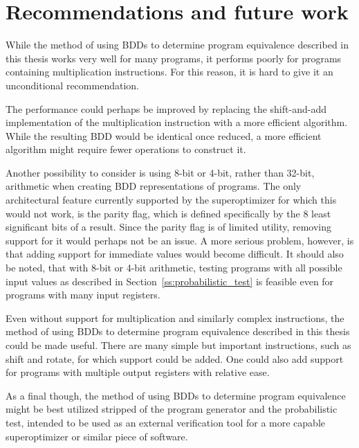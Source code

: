 \documentclass[a4paper,11pt]{kth-mag}
\begin{document}
\chapter{Recommendations and future work}
\label{ch:recommendations_future_work}

While the method of using BDDs to determine program equivalence described in this thesis works very well for many programs, it performs poorly for programs containing multiplication instructions.
For this reason, it is hard to give it an unconditional recommendation.

The performance could perhaps be improved by replacing the shift-and-add implementation of the multiplication instruction with a more efficient algorithm.
While the resulting BDD would be identical once reduced, a more efficient algorithm might require fewer operations to construct it.

Another possibility to consider is using 8-bit or 4-bit, rather than 32-bit, arithmetic when creating BDD representations of programs.
The only architectural feature currently supported by the superoptimizer for which this would not work, is the parity flag, which is defined specifically by the 8 least significant bits of a result.
Since the parity flag is of limited utility, removing support for it would perhaps not be an issue.
A more serious problem, however, is that adding support for immediate values would become difficult.
It should also be noted, that with 8-bit or 4-bit arithmetic, testing programs with all possible input values as described in Section~\ref{ss:probabilistic_test} is feasible even for programs with many input registers.

Even without support for multiplication and similarly complex instructions, the method of using BDDs to determine program equivalence described in this thesis could be made useful.
There are many simple but important instructions, such as shift and rotate, for which support could be added.
One could also add support for programs with multiple output registers with relative ease.

As a final though, the method of using BDDs to determine program equivalence might be best utilized stripped of the program generator and the probabilistic test, intended to be used as an external verification tool for a more capable superoptimizer or similar piece of software.



\end{document}
